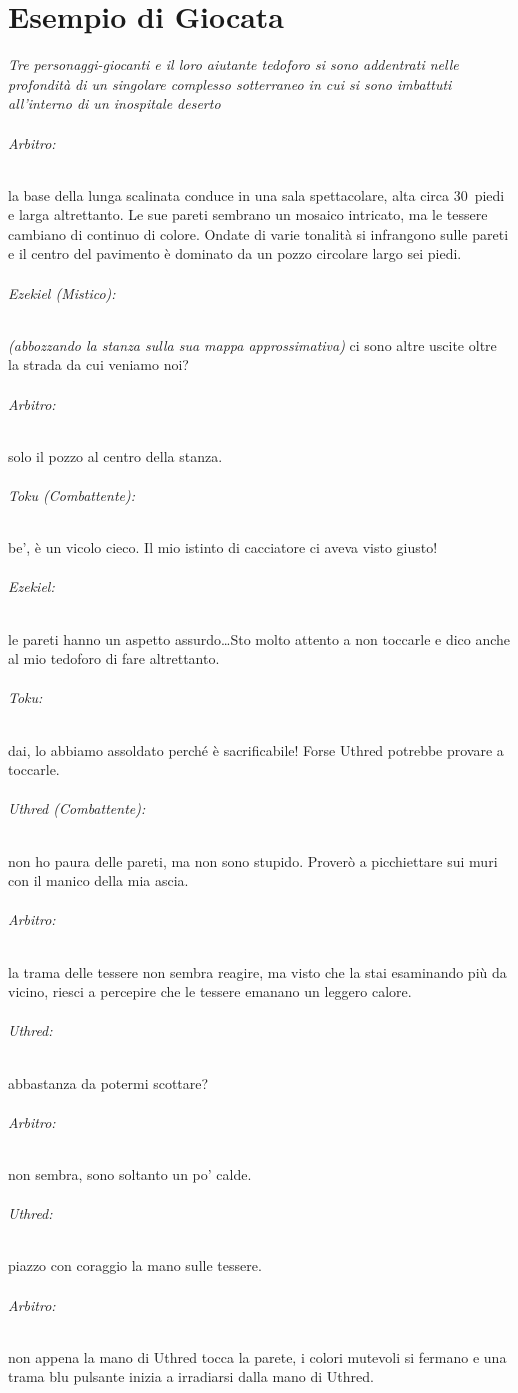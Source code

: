 \documentclass[itdr]{subfiles}
\begin{document}
\chapter{Esempio di Giocata}
\label{ch:esempio_di_giocata}
{

{\em Tre personaggi-giocanti e il loro aiutante tedoforo si sono addentrati nelle profondità di un singolare complesso sotterraneo in cui si sono imbattuti all'interno di un inospitale deserto}

\vspace{1ex}

\subparagraph{Arbitro:} la base della lunga scalinata conduce in una sala spettacolare, alta circa 30~piedi e larga altrettanto. Le sue pareti sembrano un mosaico intricato, ma le tessere cambiano di continuo di colore. Ondate di varie tonalità si infrangono sulle pareti e il centro del pavimento è dominato da un pozzo circolare largo sei piedi.

\subparagraph{Ezekiel (Mistico):} {\em (abbozzando la stanza sulla sua mappa approssimativa)} ci sono altre uscite oltre la strada da cui veniamo noi?

\subparagraph{Arbitro:} solo il pozzo al centro della stanza.

\subparagraph{Toku (Combattente):} be', è un vicolo cieco. Il mio istinto di cacciatore ci aveva visto giusto!

\subparagraph{Ezekiel:} le pareti hanno un aspetto assurdo\ldots Sto molto attento a non toccarle e dico anche al mio tedoforo di fare altrettanto.

\subparagraph{Toku:} dai, lo abbiamo assoldato perché è sacrificabile! Forse Uthred potrebbe provare a toccarle.

\subparagraph{Uthred (Combattente):} non ho paura delle pareti, ma non sono stupido. Proverò a picchiettare sui muri con il manico della mia ascia.

\subparagraph{Arbitro:} la trama delle tessere non sembra reagire, ma visto che la stai esaminando più da vicino, riesci a percepire che le tessere emanano un leggero calore.

\subparagraph{Uthred:} abbastanza da potermi scottare?

\subparagraph{Arbitro:} non sembra, sono soltanto un po' calde.

\subparagraph{Uthred:} piazzo con coraggio la mano sulle tessere.

\subparagraph{Arbitro:} non appena la mano di Uthred tocca la parete, i colori mutevoli si fermano e una trama blu pulsante inizia a irradiarsi dalla mano di Uthred.

}
\end{document}
